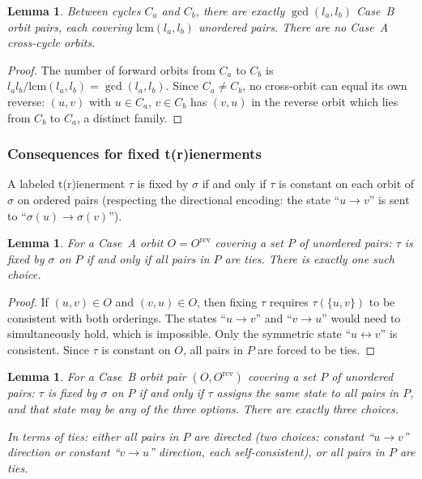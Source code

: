 \documentclass[12pt,reqno]{amsart}
\newtheorem{lemma}[theorem]{Lemma}
\theoremstyle{definition}
\theoremstyle{plain}
\newcommand{\lcm}{\mathrm{lcm}}
\begin{document}
\begin{lemma}\label{lem:cross-cycle}
Between cycles $C_a$ and $C_b$, there are exactly $\gcd(l_a,l_b)$ Case~B orbit
pairs, each covering $\lcm(l_a,l_b)$ unordered pairs.  There are no Case~A
cross-cycle orbits.
\end{lemma}

\begin{proof}
The number of forward orbits from $C_a$ to $C_b$ is $l_a l_b/\lcm(l_a,l_b)=\gcd(l_a,l_b)$.
Since $C_a\ne C_b$, no cross-orbit can equal its own reverse: $(u,v)$ with $u\in C_a$,
$v\in C_b$ has $(v,u)$ in the reverse orbit which lies from $C_b$ to $C_a$, a
distinct family.
\end{proof}

\subsubsection{Consequences for fixed t(r)ienerments}

A labeled t(r)ienerment $\tau$ is fixed by $\sigma$ if and only if $\tau$ is
constant on each orbit of $\sigma$ on ordered pairs (respecting the directional
encoding: the state ``$u\to v$'' is sent to ``$\sigma(u)\to\sigma(v)$'').

\begin{lemma}\label{lem:case-a-forced}
For a Case~A orbit $O=O^{\mathrm{rev}}$ covering a set $P$ of unordered pairs:
$\tau$ is fixed by $\sigma$ on $P$ if and only if all pairs in $P$ are ties.
There is exactly one such choice.
\end{lemma}

\begin{proof}
If $(u,v)\in O$ and $(v,u)\in O$, then fixing $\tau$ requires $\tau(\{u,v\})$
to be consistent with both orderings.  The states ``$u\to v$'' and ``$v\to u$''
would need to simultaneously hold, which is impossible.  Only the symmetric
state ``$u\leftrightarrow v$'' is consistent.  Since $\tau$ is constant on $O$,
all pairs in $P$ are forced to be ties.
\end{proof}

\begin{lemma}\label{lem:case-b-free}
For a Case~B orbit pair $(O,O^{\mathrm{rev}})$ covering a set $P$ of unordered
pairs: $\tau$ is fixed by $\sigma$ on $P$ if and only if $\tau$ assigns the
same state to all pairs in $P$, and that state may be any of the three options.
There are exactly three choices.

In terms of ties: either all pairs in $P$ are directed (two choices: constant
``$u\to v$'' direction or constant ``$v\to u$'' direction, each self-consistent),
or all pairs in $P$ are ties.
\end{lemma}
\end{document}
